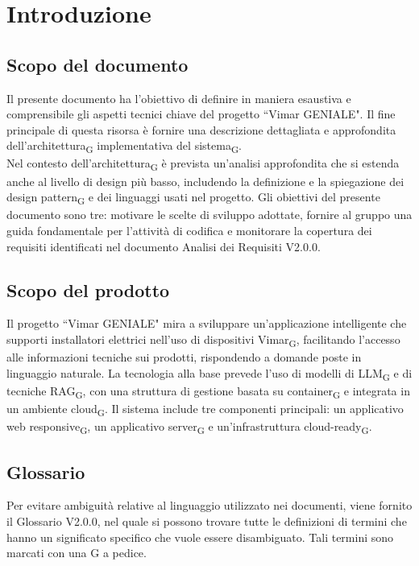 \section{Introduzione}
\subsection{Scopo del documento}
Il presente documento ha l’obiettivo di definire in maniera esaustiva e comprensibile gli aspetti tecnici chiave del progetto ``Vimar GENIALE". Il fine principale di questa risorsa è fornire una descrizione dettagliata e approfondita dell'architettura\textsubscript{G} implementativa del sistema\textsubscript{G}. \\
Nel contesto dell'architettura\textsubscript{G} è prevista un'analisi approfondita che si estenda anche al livello di design più basso, includendo la definizione e la spiegazione dei design pattern\textsubscript{G} e dei linguaggi usati nel progetto.
Gli obiettivi del presente documento sono tre: motivare le scelte di sviluppo adottate, fornire al gruppo una guida fondamentale per l'attività di codifica e monitorare la copertura dei requisiti identificati nel documento Analisi dei Requisiti V2.0.0.

\subsection{Scopo del prodotto}
Il progetto ``Vimar GENIALE" mira a sviluppare un'applicazione intelligente che supporti installatori elettrici nell'uso di dispositivi Vimar\textsubscript{G}, facilitando l'accesso alle informazioni tecniche sui prodotti, rispondendo a domande poste in linguaggio naturale.
La tecnologia alla base prevede l'uso di modelli di LLM\textsubscript{G} e di tecniche RAG\textsubscript{G}, con una struttura di gestione basata su container\textsubscript{G} e integrata in un ambiente cloud\textsubscript{G}.
Il sistema include tre componenti principali: un applicativo web responsive\textsubscript{G}, un applicativo server\textsubscript{G} e un'infrastruttura cloud-ready\textsubscript{G}. 
\subsection{Glossario}
Per evitare ambiguità relative al linguaggio utilizzato nei documenti, viene fornito il Glossario V2.0.0, nel quale si possono trovare tutte le definizioni di termini che hanno un significato specifico che vuole essere disambiguato. Tali termini sono marcati con una G a pedice. 
